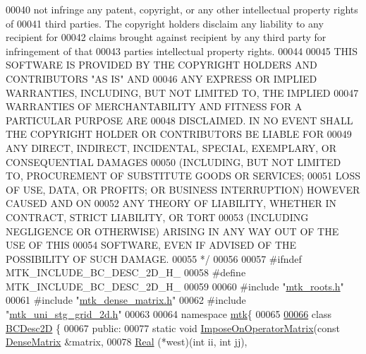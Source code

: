 \begin{DoxyCode}
00040 \textcolor{comment}{not infringe any patent, copyright, or any other intellectual property rights of}
00041 \textcolor{comment}{third parties. The copyright holders disclaim any liability to any recipient for}
00042 \textcolor{comment}{claims brought against recipient by any third party for infringement of that}
00043 \textcolor{comment}{parties intellectual property rights.}
00044 \textcolor{comment}{}
00045 \textcolor{comment}{THIS SOFTWARE IS PROVIDED BY THE COPYRIGHT HOLDERS AND CONTRIBUTORS "AS IS" AND}
00046 \textcolor{comment}{ANY EXPRESS OR IMPLIED WARRANTIES, INCLUDING, BUT NOT LIMITED TO, THE IMPLIED}
00047 \textcolor{comment}{WARRANTIES OF MERCHANTABILITY AND FITNESS FOR A PARTICULAR PURPOSE ARE}
00048 \textcolor{comment}{DISCLAIMED. IN NO EVENT SHALL THE COPYRIGHT HOLDER OR CONTRIBUTORS BE LIABLE FOR}
00049 \textcolor{comment}{ANY DIRECT, INDIRECT, INCIDENTAL, SPECIAL, EXEMPLARY, OR CONSEQUENTIAL DAMAGES}
00050 \textcolor{comment}{(INCLUDING, BUT NOT LIMITED TO, PROCUREMENT OF SUBSTITUTE GOODS OR SERVICES;}
00051 \textcolor{comment}{LOSS OF USE, DATA, OR PROFITS; OR BUSINESS INTERRUPTION) HOWEVER CAUSED AND ON}
00052 \textcolor{comment}{ANY THEORY OF LIABILITY, WHETHER IN CONTRACT, STRICT LIABILITY, OR TORT}
00053 \textcolor{comment}{(INCLUDING NEGLIGENCE OR OTHERWISE) ARISING IN ANY WAY OUT OF THE USE OF THIS}
00054 \textcolor{comment}{SOFTWARE, EVEN IF ADVISED OF THE POSSIBILITY OF SUCH DAMAGE.}
00055 \textcolor{comment}{*/}
00056 
00057 \textcolor{preprocessor}{#ifndef MTK\_INCLUDE\_BC\_DESC\_2D\_H\_}
00058 \textcolor{preprocessor}{#define MTK\_INCLUDE\_BC\_DESC\_2D\_H\_}
00059 
00060 \textcolor{preprocessor}{#include "\hyperlink{mtk__roots_8h}{mtk\_roots.h}"}
00061 \textcolor{preprocessor}{#include "\hyperlink{mtk__dense__matrix_8h}{mtk\_dense\_matrix.h}"}
00062 \textcolor{preprocessor}{#include "\hyperlink{mtk__uni__stg__grid__2d_8h}{mtk\_uni\_stg\_grid\_2d.h}"}
00063 
00064 \textcolor{keyword}{namespace }\hyperlink{namespacemtk}{mtk}\{
00065 
\hypertarget{mtk__bc__desc__2d_8h_source_l00066}{}\hyperlink{classmtk_1_1BCDesc2D}{00066} \textcolor{keyword}{class }\hyperlink{classmtk_1_1BCDesc2D}{BCDesc2D} \{
00067  \textcolor{keyword}{public}:
00077   \textcolor{keyword}{static} \textcolor{keywordtype}{void} \hyperlink{classmtk_1_1BCDesc2D_a1d03ee7abaa6d95649a9ba3c71e407cd}{ImposeOnOperatorMatrix}(\textcolor{keyword}{const} \hyperlink{classmtk_1_1DenseMatrix}{DenseMatrix} &matrix,
00078                                      \hyperlink{group__c01-roots_gac080bbbf5cbb5502c9f00405f894857d}{Real} (*west)(\textcolor{keywordtype}{int} ii, \textcolor{keywordtype}{int} jj),

\end{DoxyCode}

